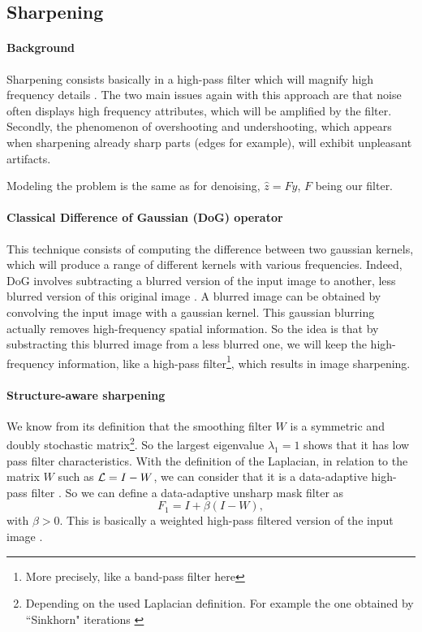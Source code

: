 \subsection{Sharpening}

\paragraph{Background}

Sharpening consists basically in a high-pass filter which will magnify high frequency details \cite{kheradmand_graph-based_2016}.
The two main issues again with this approach are that noise often displays high frequency attributes, which will be amplified by the filter.
Secondly, the phenomenon of overshooting and undershooting, which appears when sharpening already sharp parts (edges for example), will exhibit unpleasant artifacts.

Modeling the problem is the same as for denoising, \(\hat{z} = Fy\), \(F\) being our filter.

\paragraph{Classical Difference of Gaussian (DoG) operator}

This technique consists of computing the difference between two gaussian kernels, which will produce a range of different kernels with various frequencies.
Indeed, DoG involves subtracting a blurred version of the input image to another, less blurred version of this original image \cite{wiki:Difference_of_Gaussians}.
A blurred image can be obtained by convolving the input image with a gaussian kernel.
This gaussian blurring actually removes high-frequency spatial information.
So the idea is that by substracting this blurred image from a less blurred one, we will keep the high-frequency information, like a high-pass filter\footnote{More precisely, like a band-pass filter here}, which results in image sharpening.

\paragraph{Structure-aware sharpening}

We know from its definition \cite{kheradmand_non-linear_2015} that the smoothing filter \(W\) is a symmetric and doubly stochastic matrix\footnote{Depending on the used Laplacian definition. For example the one obtained by ``Sinkhorn" iterations \cite{milanfar_symmetrizing_2013}}.
So the largest eigenvalue \(\lambda_1 = 1\) shows that it has low pass filter characteristics.
With the definition of the Laplacian, in relation to the matrix \(W\) such as \(\operatorname{\mathcal{L}} = I - W\), we can consider that it is a data-adaptive high-pass filter \cite{kheradmand_graph-based_2016}.
So we can define a data-adaptive unsharp mask filter as
\[F_1 = I + \beta (I-W),\]
with \(\beta > 0\). This is basically a weighted high-pass filtered version of the input image \cite{siam_slides_2016}.

